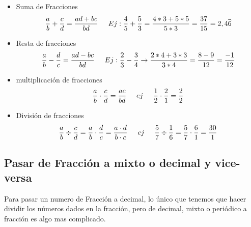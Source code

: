 \documentclass{article}
\begin{document}
\begin{itemize}
	\item{Suma de Fracciones}
	\begin{equation*}
		\frac{a}{b} + \frac{c}{d} = \frac{ad+bc}{bd} \hspace{0.5cm} Ej: \frac{4}{5} + \frac{5}{3} = \frac{4*3 + 5*5}{5*3} = \frac{37}{15} = 2,4\wideparen{6}
	\end{equation*}
	\item{Resta de fracciones}
	\begin{equation*}
		\frac{a}{b} - \frac{d}{c} = \frac{ad-bc}{bd} \hspace{0.5cm} Ej: \frac{2}{3} - \frac{3}{4}  \rightarrow \frac{2*4 + 3*3}{3*4} = \frac{8-9}{12}= \frac{-1}{12}
	\end{equation*}
	\item{multiplicación de fracciones}
	\begin{equation*}
		\frac{a}{b} \cdot \frac{c}{d} = \frac{ac}{bd} \hspace{0.5cm}ej\hspace{0.5cm} \frac{1}{2} \cdot \frac{2}{1} = \frac{2}{2}
	\end{equation*}
	\item{División de fracciones}
	\begin{equation*}
		\frac{a}{b} \div \frac{c}{d} = \frac{a}{b} \cdot \frac{d}{c} = \frac{a \cdot d}{b \cdot c} \hspace{0.5cm}ej\hspace{0.5cm} \frac{5}{7} \div \frac{1}{6} = \frac{5}{7} \cdot \frac{6}{1} = \frac{30}{1}
	\end{equation*}
\end{itemize}
	\pagebreak
	\subsection{Pasar de Fracción a mixto o decimal y vice-versa}
		\begin{theo}
			Para pasar un numero de Fracción a decimal, lo único que tenemos que hacer dividir los números dados en la fracción, pero de decimal, mixto o periódico a fracción es algo mas complicado.
		\end{theo} 
		
\end{document}
